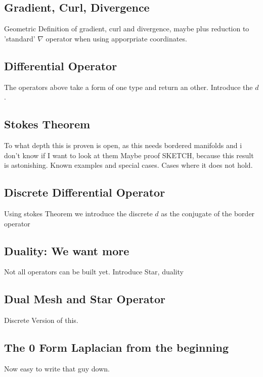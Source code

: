\documentclass[draft]{scrbook}
\begin{document}
	\subsection{Gradient, Curl, Divergence}
		Geometric Definition of gradient, curl and divergence, maybe plus reduction to 'standard' $\nabla$ operator when using apporpriate coordinates.
	\subsection{Differential Operator}
		The operators above take a form of one type and return an other.
		Introduce the $d$.
	\subsection{Stokes Theorem}
		To what depth this is proven is open, as this needs bordered manifolds and i don't know if I want to look at them
		Maybe proof SKETCH, because this result is astonishing.
		Known examples and special cases. Cases where it does not hold.
	\subsection{Discrete Differential Operator}
		Using stokes Theorem we introduce the discrete $d$ as the conjugate of the border operator
	\subsection{Duality: We want more}
		Not all operators can be built yet. Introduce Star, duality
	\subsection{Dual Mesh and Star Operator}
		Discrete Version of this.
	\subsection{The 0 Form Laplacian from the beginning}
		Now easy to write that guy down.
\newpage		
\end{document}
